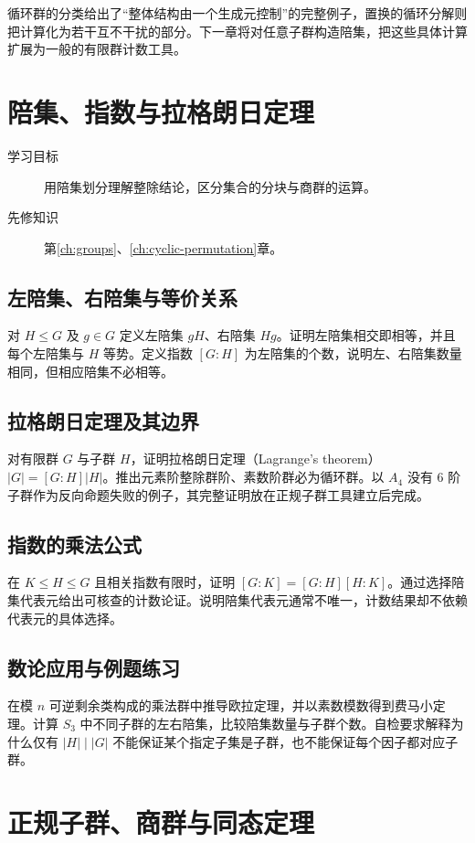 \documentclass[UTF8,12pt,a4paper,fontset=fandol]{ctexbook}
\begin{document}
循环群的分类给出了“整体结构由一个生成元控制”的完整例子，置换的循环分解则把计算化为若干互不干扰的部分。下一章将对任意子群构造陪集，把这些具体计算扩展为一般的有限群计数工具。

\chapter{陪集、指数与拉格朗日定理}\label{ch:cosets}

\begin{description}
  \item[学习目标] 用陪集划分理解整除结论，区分集合的分块与商群的运算。
  \item[先修知识] 第\ref{ch:groups}、\ref{ch:cyclic-permutation}章。
\end{description}

\section{左陪集、右陪集与等价关系}
对 $H\leq G$ 及 $g\in G$ 定义左陪集 $gH$、右陪集 $Hg$。证明左陪集相交即相等，并且每个左陪集与 $H$ 等势。定义指数 $[G:H]$ 为左陪集的个数，说明左、右陪集数量相同，但相应陪集不必相等。

\section{拉格朗日定理及其边界}
对有限群 $G$ 与子群 $H$，证明拉格朗日定理（Lagrange's theorem）$|G|=[G:H]|H|$。推出元素阶整除群阶、素数阶群必为循环群。以 $A_4$ 没有 $6$ 阶子群作为反向命题失败的例子，其完整证明放在正规子群工具建立后完成。

\section{指数的乘法公式}
在 $K\leq H\leq G$ 且相关指数有限时，证明 $[G:K]=[G:H][H:K]$。通过选择陪集代表元给出可核查的计数论证。说明陪集代表元通常不唯一，计数结果却不依赖代表元的具体选择。

\section{数论应用与例题练习}
在模 $n$ 可逆剩余类构成的乘法群中推导欧拉定理，并以素数模数得到费马小定理。计算 $S_3$ 中不同子群的左右陪集，比较陪集数量与子群个数。自检要求解释为什么仅有 $|H|\mid |G|$ 不能保证某个指定子集是子群，也不能保证每个因子都对应子群。

\chapter{正规子群、商群与同态定理}\label{ch:quotient-groups}
\end{document}
